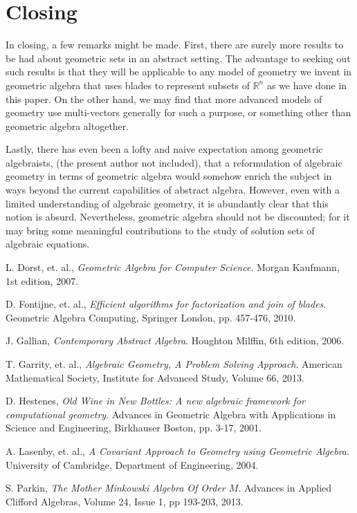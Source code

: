\documentclass{birkjour}
\theoremstyle{definition}
\theoremstyle{remark}
\numberwithin{equation}{section}
\newcommand{\R}{\mathbb{R}}
\begin{document}
\section{Closing}

In closing, a few remarks might be made.  First, there are surely more results to be had
about geometric sets in an abstract setting.  The advantage to seeking out such
results is that they will be applicable to any model of geometry we invent
in geometric algebra that uses blades to represent subsets of $\R^n$ as we have
done in this paper.  On the other hand,
we may find that more advanced models of geometry use multi-vectors generally
for such a purpose, or something other than geometric algebra altogether.

Lastly, there has even been a
lofty and naive expectation among geometric algebraists, (the present author not included),
that a reformulation of algebraic geometry in terms of geometric algebra would somehow enrich the subject
in ways beyond the current capabilities of abstract algebra.  However, even with a limited understanding
of algebraic geometry, it is abundantly clear that this notion is absurd.  Nevertheless,
geometric algebra should not be discounted; for it may bring some meaningful
contributions to the study of solution sets of algebraic equations.

\begin{thebibliography}{9}

L. Dorst, et. al.,
\emph{Geometric Algebra for Computer Science}.
Morgan Kaufmann, 1st edition, 2007.

D. Fontijne, et. al.,
\emph{Efficient algorithms for factorization and join of blades}.
Geometric Algebra Computing, Springer London, pp. 457-476, 2010.

J. Gallian,
\emph{Contemporary Abstract Algebra}.
Houghton Milffin, 6th edition, 2006.

T. Garrity, et. al.,
\emph{Algebraic Geometry, A Problem Solving Approach}.
American Mathematical Society, Institute for Advanced Study,
Volume 66, 2013.

D. Hestenes,
\emph{Old Wine in New Bottles: A new algebraic framework for computational geometry}.
Advances in Geometric Algebra with Applications in Science and Engineering,
Birkhauser Boston, pp. 3-17, 2001.

A. Lasenby, et. al.,
\emph{A Covariant Approach to Geometry using Geometric Algebra}.
University of Cambridge, Department of Engineering, 2004.

S. Parkin,
\emph{The Mother Minkowski Algebra Of Order $M$}.
Advances in Applied Clifford Algebras, Volume 24, Issue 1, pp 193-203, 2013.

\end{thebibliography}
\end{document}

